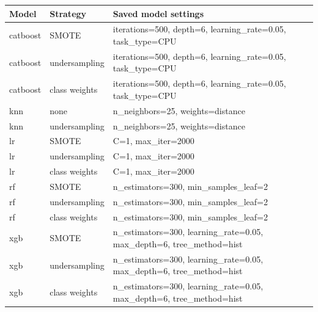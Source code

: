 \begin{tabular}{llp{}}
\toprule
Model & Strategy & Saved model settings \\
\midrule
catboost & SMOTE & iterations=500, depth=6, learning\_rate=0.05, task\_type=CPU \\
catboost & undersampling & iterations=500, depth=6, learning\_rate=0.05, task\_type=CPU \\
catboost & class weights & iterations=500, depth=6, learning\_rate=0.05, task\_type=CPU \\
knn & none & n\_neighbors=25, weights=distance \\
knn & undersampling & n\_neighbors=25, weights=distance \\
lr & SMOTE & C=1, max\_iter=2000 \\
lr & undersampling & C=1, max\_iter=2000 \\
lr & class weights & C=1, max\_iter=2000 \\
rf & SMOTE & n\_estimators=300, min\_samples\_leaf=2 \\
rf & undersampling & n\_estimators=300, min\_samples\_leaf=2 \\
rf & class weights & n\_estimators=300, min\_samples\_leaf=2 \\
xgb & SMOTE & n\_estimators=300, learning\_rate=0.05, max\_depth=6, tree\_method=hist \\
xgb & undersampling & n\_estimators=300, learning\_rate=0.05, max\_depth=6, tree\_method=hist \\
xgb & class weights & n\_estimators=300, learning\_rate=0.05, max\_depth=6, tree\_method=hist \\
\bottomrule
\end{tabular}
